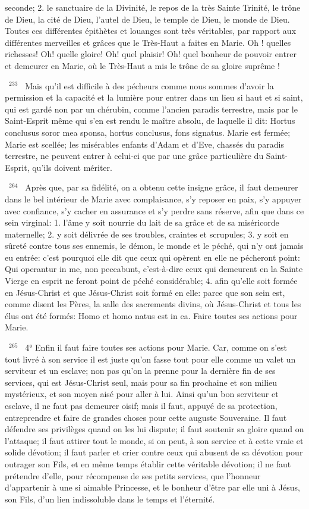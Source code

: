 \documentclass[paper=a5,pagesize=pdftex,fontsize=15pt,headinclude=on,twoside=off]{scrbook}
\newcommand{\negphantom}[1]{\settowidth{\dimen0}{#1}\hspace*{-\dimen0}}
\newcommand{\versenb}[1]{\par \vspace{10pt}~\negphantom{~${}^{#1}$~}${}^{#1}$~}
\begin{document}
seconde; 2. le sanctuaire de la Divinité, le repos de la très Sainte Trinité, le trône de Dieu, la cité de Dieu, l'autel de
Dieu, le temple de Dieu, le monde de Dieu. Toutes ces différentes épithètes et louanges sont très véritables, par
rapport aux différentes merveilles et grâces que le Très-Haut a faites en Marie. Oh ! quelles richesses! Oh! quelle
gloire! Oh! quel plaisir! Oh! quel bonheur de pouvoir entrer et demeurer en Marie, où le Très-Haut a mis le trône de
sa gloire suprême !
\versenb{233} Mais qu'il est difficile à des pécheurs comme nous sommes d'avoir la permission et la capacité et la lumière
pour entrer dans un lieu si haut et si saint, qui est gardé non par un chérubin, comme l'ancien paradis terrestre,
mais par le Saint-Esprit même qui s'en est rendu le maître absolu, de laquelle il dit: Hortus conclusus soror mea
sponsa, hortus conclusus, fons signatus. Marie est fermée; Marie est scellée; les misérables enfants d'Adam et
d'Eve, chassés du paradis terrestre, ne peuvent entrer à celui-ci que par une grâce particulière du Saint-Esprit,
qu'ils doivent mériter.
\versenb{264} Après que, par sa fidélité, on a obtenu cette insigne grâce, il faut demeurer dans le bel intérieur de Marie
avec complaisance, s'y reposer en paix, s'y appuyer avec confiance, s'y cacher en assurance et s'y perdre sans
réserve, afin que dans ce sein virginal: 1. l'âme y soit nourrie du lait de sa grâce et de sa miséricorde maternelle; 2.
y soit délivrée de ses troubles, craintes et scrupules; 3. y soit en sûreté contre tous ses ennemis, le démon, le
monde et le péché, qui n'y ont jamais eu entrée: c'est pourquoi elle dit que ceux qui opèrent en elle ne pécheront
point: Qui operantur in me, non peccabunt, c'est-à-dire ceux qui demeurent en la Sainte Vierge en esprit ne feront
point de péché considérable; 4. afin qu'elle soit formée en Jésus-Christ et que Jésus-Christ soit formé en elle:
parce que son sein est, comme disent les Pères, la salle des sacrements divins, où Jésus-Christ et tous les élus
ont été formés: Homo et homo natus est in ea.
Faire toutes ses actions pour Marie.
\versenb{265} 4° Enfin il faut faire toutes ses actions pour Marie. Car, comme on s'est tout livré à son service il est juste
qu'on fasse tout pour elle comme un valet un serviteur et un esclave; non pas qu'on la prenne pour la dernière fin
de ses services, qui est Jésus-Christ seul, mais pour sa fin prochaine et son milieu mystérieux, et son moyen aisé
pour aller à lui. Ainsi qu'un bon serviteur et esclave, il ne faut pas demeurer oisif; mais il faut, appuyé de sa
protection, entreprendre et faire de grandes choses pour cette auguste Souveraine. Il faut défendre ses privilèges
quand on les lui dispute; il faut soutenir sa gloire quand on l'attaque; il faut attirer tout le monde, si on peut, à son
service et à cette vraie et solide dévotion; il faut parler et crier contre ceux qui abusent de sa dévotion pour
outrager son Fils, et en même temps établir cette véritable dévotion; il ne faut prétendre d'elle, pour récompense
de ses petits services, que l'honneur d'appartenir à une si aimable Princesse, et le bonheur d'être par elle uni à
Jésus, son Fils, d'un lien indissoluble dans le temps et l'éternité.
\end{document}
